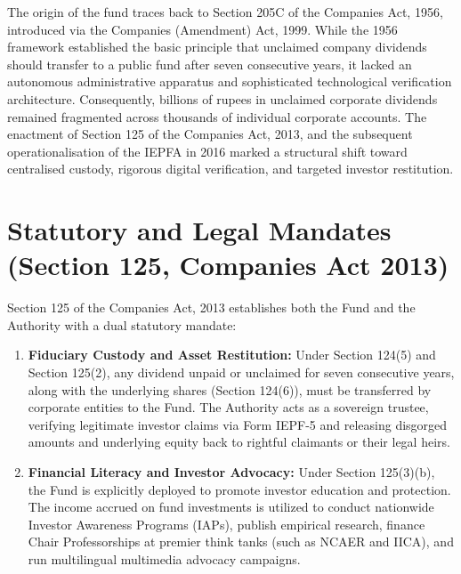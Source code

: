 \documentclass[openany]{book}
\begin{document}
The origin of the fund traces back to Section 205C of the Companies Act, 1956, introduced via the Companies (Amendment) Act, 1999. While the 1956 framework established the basic principle that unclaimed company dividends should transfer to a public fund after seven consecutive years, it lacked an autonomous administrative apparatus and sophisticated technological verification architecture. Consequently, billions of rupees in unclaimed corporate dividends remained fragmented across thousands of individual corporate accounts. The enactment of Section 125 of the Companies Act, 2013, and the subsequent operationalisation of the IEPFA in 2016 marked a structural shift toward centralised custody, rigorous digital verification, and targeted investor restitution.

\section{Statutory and Legal Mandates (Section 125, Companies Act 2013)}
Section 125 of the Companies Act, 2013 establishes both the Fund and the Authority with a dual statutory mandate:
\begin{enumerate}
    \item \textbf{Fiduciary Custody and Asset Restitution:} Under Section 124(5) and Section 125(2), any dividend unpaid or unclaimed for seven consecutive years, along with the underlying shares (Section 124(6)), must be transferred by corporate entities to the Fund. The Authority acts as a sovereign trustee, verifying legitimate investor claims via Form IEPF-5 and releasing disgorged amounts and underlying equity back to rightful claimants or their legal heirs.
    \item \textbf{Financial Literacy and Investor Advocacy:} Under Section 125(3)(b), the Fund is explicitly deployed to promote investor education and protection. The income accrued on fund investments is utilized to conduct nationwide Investor Awareness Programs (IAPs), publish empirical research, finance Chair Professorships at premier think tanks (such as NCAER and IICA), and run multilingual multimedia advocacy campaigns.
\end{enumerate}
\end{document}

